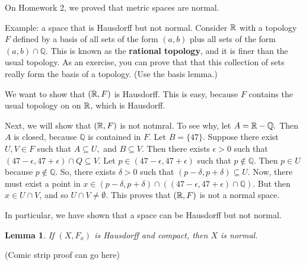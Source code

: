 \documentclass{amsart}
\newcommand{\Q}{\mathbb Q}\newcommand{\C}{\mathbb C}
\newtheorem{lem}{Lemma}
\begin{document}
On Homework 2, we proved that metric spaces are normal.

Example: a space that is Hausdorff but not normal.  Consider $\mathbb R$ with a topology $F$ defined by a basis of all sets of the form $(a,b)$ plus all sets of the form $(a,b)\cap \Q.$  This is known as the \textbf{rational topology}, and it is finer than the usual topology.  As an exercise, you can prove that that this collection of sets really form the basis of a topology.  (Use the basis lemma.)


We want to show that $(\mathbb R,F)$ is Hausdorff.  This is easy, because $F$ contains the usual topology on on $\mathbb R$, which is Hausdorff.  


Next, we will show that $(\mathbb R,F)$ is not notmral.  To see why, let $A=\R-\Q.$  Then $A$ is closed, because $\Q$ is contained in $F$.  Let $B=\{47\}.$  Suppose there exist $U,V \in F$ such that $A \subseteq U,$ and $B \subseteq V$.  Then there exists $\epsilon>0$ such that $(47-\epsilon,47+\epsilon)\cap Q \subseteq V$.  Let $p \in (47-\epsilon,47+\epsilon)$ such that $p \not\in \Q.$  Then $p \in U$ because $p \not\in \Q$.  So, there exists $\delta>0$ such that $(p-\delta,p+\delta) \subseteq U$.  Now, there must exist a point in $x \in (p-\delta,p+\delta)\cap((47-\epsilon,47+\epsilon)\cap \Q).$  But then $x \in U \cap V$, and so $U \cap V \neq \emptyset$.  This proves that $(\mathbb R,F)$ is not a normal space.

In particular, we have shown that a space can be Hausdorff but not normal.  

\begin{lem}  If $(X,F_x)$ is Hausdorff and compact, then $X$ is normal.
\end{lem}
(Comic strip proof can go here)
\vspace{3 in}
\end{document}
